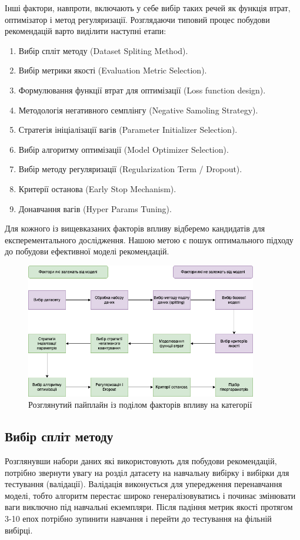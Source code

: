 Інші фактори, навпроти, включають у себе вибір таких речей як функція втрат, оптимізатор і метод регуляризації.
Розглядаючи типовий процес побудови рекомендацій варто виділити наступні  етапи:
\begin{enumerate}
    \item Вибір спліт методу (Dataset Spliting Method).
    \item Вибір метрики якості (Evaluation Metric Selection).
    \item Формулювання функції втрат для оптимізації (Loss function design).
    \item Методологія негативного семплінгу (Negative Samoling Strategy).
    \item Стратегія ініціалізації вагів (Parameter Initializer Selection).
    \item Вибір алгоритму оптимізації (Model Optimizer Selection).
    \item Вибір методу регуляризації (Regularization Term /  Dropout).
    \item Критерії останова (Early Stop Mechanism).
    \item Донавчання вагів (Hyper Params Tuning).
\end{enumerate}
Для кожного із вищевказаних факторів впливу відберемо кандидатів для експерементального дослідження. Нашою метою є пошук оптимального підходу до побудови ефективної моделі рекомендацій.
\begin{figure}
    \centering
    \includegraphics[width=0.9\textwidth]{images/FactorsTypes.png}
    \caption{Розглянутий пайплайн із поділом факторів впливу на категорії}
\end{figure}
\subsection{Вибір спліт методу}
Розглянувши набори даних які використовують для побудови рекомендацій, потрібно звернути увагу на розділ датасету на навчальну вибірку і вибірки для тестування (валідації). Валідація виконується для упередження перенавчання моделі, тобто алгоритм перестає широко генералізовуватись і починає змінювати ваги виключно під навчальні екземпляри. Після падіння метрик якості протягом 3-10 епох потрібно зупинити навчання і перейти до тестування на фільній вибірці.

